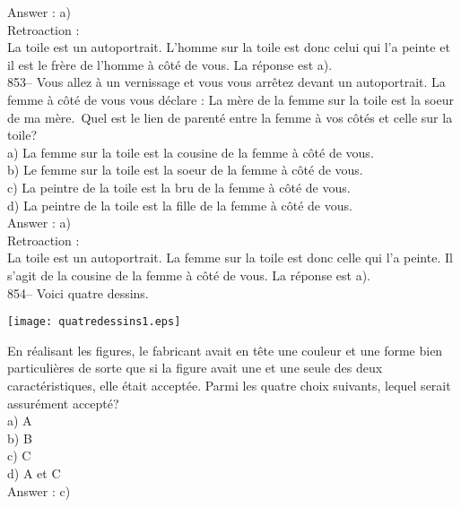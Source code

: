 ﻿\documentclass[letterpaper, 12pt]{article}
\begin{document}
Answer : a)\\

Retroaction :\\
La toile est un autoportrait.  L'homme sur la toile est donc celui qui l'a
peinte et il est le fr\`ere de l'homme \`a c\^ot\'e de vous.  La r\'eponse
est a).\\

853-- Vous allez \`a un vernissage et vous vous arr\^etez devant un
autoportrait.  La femme \`a c\^ot\'e de vous vous d\'eclare : \og La
m\`ere de la femme sur la toile est la soeur de ma m\`ere.\fg\  Quel
est le lien de parent\'e entre la femme \`a vos c\^ot\'es et celle sur la toile?\\
a) La femme sur la toile est la cousine de la femme \`a c\^ot\'e de vous.\\
b) Le femme sur la toile est la soeur de la femme \`a c\^ot\'e de vous.\\
c) La peintre de la toile est la bru de la femme \`a c\^ot\'e de vous.\\
d) La peintre de la toile est la fille de la femme \`a c\^ot\'e de vous.\\

Answer : a)\\

Retroaction : \\
La toile est un autoportrait.  La femme sur la toile est donc celle qui l'a
peinte.  Il s'agit de la cousine de la femme \`a c\^ot\'e de vous.  La
r\'eponse est a).\\

854-- Voici quatre dessins.
    \begin{center}
    \texttt{[image: quatredessins1.eps]}
    \end{center}

En r\'ealisant les figures, le fabricant avait en t\^ete une couleur et une
forme bien particuli\`eres de sorte que si la figure avait une et une seule
des deux caract\'eristiques, elle \'etait accept\'ee.  Parmi les quatre
choix suivants, lequel serait assur\'ement accept\'e?\\
a) A\\
b) B\\
c) C\\
d) A et C\\

Answer : c)\\
\end{document}
